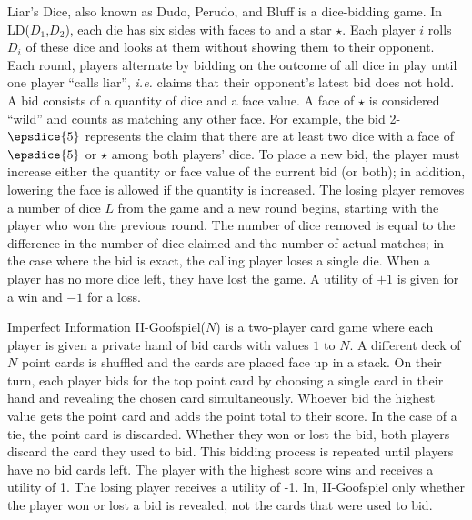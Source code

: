 \documentclass[letterpaper]{article}
\newcommand{\ie}{{\it i.e.}\xspace}
\begin{document}
Liar's Dice, also known as Dudo, Perudo, and Bluff is a dice-bidding game. 
In LD($D_1$,$D_2$), each die has six sides with faces  to  and a star $\star$. 
Each player $i$ rolls $D_i$ of these dice and looks at them without showing them to their opponent. 
Each round, players alternate by bidding on the outcome of all dice in play until one player ``calls liar'', 
\ie claims that their opponent's latest bid does not hold.
A bid consists of a quantity of dice and a face value.  
A face of $\star$ is considered ``wild'' and counts as matching any other face.
For example, the bid 2-$\epsdice{5}$ represents the claim that there are at least two dice with a face of 
$\epsdice{5}$ or $\star$ among both players' dice. 
To place a new bid, the player must increase either the quantity or face value of the current 
bid (or both); in addition, lowering the face is allowed if the quantity is increased. 
The losing player removes a number of dice $L$ from the game and a new round begins, starting
with the player who won the previous round. 
The number of dice removed is equal to the difference in the number of dice claimed and the number of actual 
matches; in the case where the bid is exact, the calling player loses a single die. 
When a player has no more dice left, they have lost the game. 
A utility of $+1$ is given for a win and $-1$ for a loss.

Imperfect Information II-Goofspiel($N$) is a two-player card game where each player is
given a private hand of bid cards with values $1$ to $N$. A different
deck of $N$ point cards is shuffled and the cards are placed face up
in a stack. On their turn, each player bids for the top point card by 
choosing a single card in their hand and revealing the chosen card simultaneously. 
Whoever bid the highest value gets the point card and adds the point total to their score.  
In the case of a tie, the point card is discarded.  Whether they won or
lost the bid, both players discard the card they used to bid.  
This bidding process is repeated until players have no bid cards left. 
The player with the highest score wins and receives a utility of 1. The losing player 
receives a utility of -1. In, II-Goofspiel only whether the player won or lost a bid is 
revealed, not the cards that were used to bid.  

\end{document}
